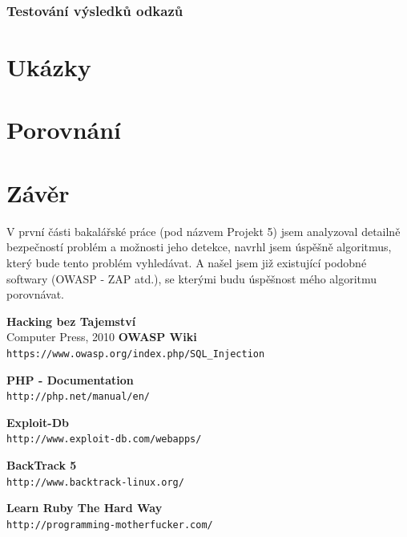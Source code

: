 \documentclass[12pt, a4paper]{report}
\begin{document}
\subsection{Testování výsledků odkazů}

\chapter{Ukázky}

\chapter{Porovnání}

\chapter{Závěr}
V první části bakalářské práce (pod názvem Projekt 5) jsem analyzoval detailně bezpečností problém a možnosti jeho detekce, navrhl jsem úspěšně algoritmus, který bude tento problém vyhledávat. A našel jsem již existující podobné softwary (OWASP - ZAP  atd.), se kterými budu úspěšnost mého algoritmu porovnávat.

\begin{thebibliography}{9}
               {\bf Hacking bez Tajemství} \\
           Computer Press, 2010
	{\bf OWASP Wiki} \\
	\texttt{https://www.owasp.org/index.php/SQL\_Injection}

	{\bf PHP - Documentation}\\
	\texttt{http://php.net/manual/en/}

	{\bf Exploit-Db}\\
	\texttt{http://www.exploit-db.com/webapps/}

 {\bf BackTrack 5}\\
	\texttt{http://www.backtrack-linux.org/}

 {\bf Learn Ruby The Hard Way}\\
	\texttt{http://programming-motherfucker.com/}

\end{thebibliography}
\end{document}
